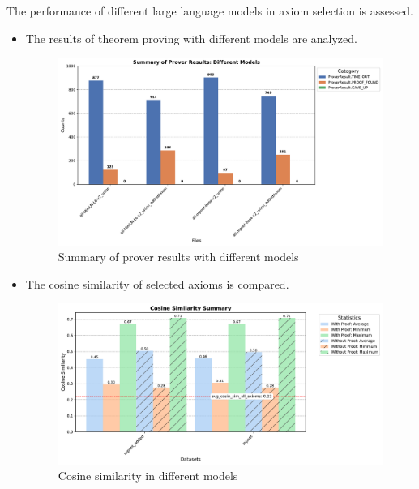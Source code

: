 \documentclass[english,version-2020-11]{uzl-thesis}
\begin{document}
The performance of different large language models in axiom selection is assessed.

\begin{itemize}
    \item The results of theorem proving with different models are analyzed.
    \begin{figure}[h!]
        \centering
        \includegraphics[width=\textwidth]{different_mode_output.pdf}
        \caption{Summary of prover results with different models}
        \label{fig:results_different_models}
    \end{figure}        
    \FloatBarrier

    \item The cosine similarity of selected axioms is compared.
    \begin{figure}[h!]
        \centering
        \includegraphics[width=\textwidth]{cosine_similarity_mpnet_summary.pdf}
        \caption{Cosine similarity in different models}
        \label{fig:cosine_similarity_mpnet}
    \end{figure}
    \FloatBarrier
\end{itemize}
\end{document}
